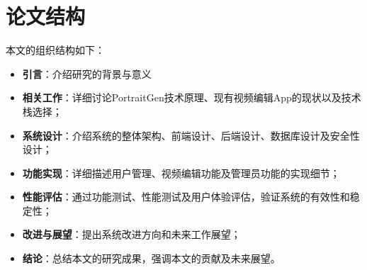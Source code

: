 \section{论文结构}

本文的组织结构如下：
\begin{itemize}
    \item \textbf{引言}：介绍研究的背景与意义
    \item \textbf{相关工作}：详细讨论PortraitGen技术原理、现有视频编辑App的现状以及技术栈选择；
    \item \textbf{系统设计}：介绍系统的整体架构、前端设计、后端设计、数据库设计及安全性设计；
    \item \textbf{功能实现}：详细描述用户管理、视频编辑功能及管理员功能的实现细节；
    \item \textbf{性能评估}：通过功能测试、性能测试及用户体验评估，验证系统的有效性和稳定性；
    \item \textbf{改进与展望}：提出系统改进方向和未来工作展望；
    \item \textbf{结论}：总结本文的研究成果，强调本文的贡献及未来展望。
\end{itemize}

